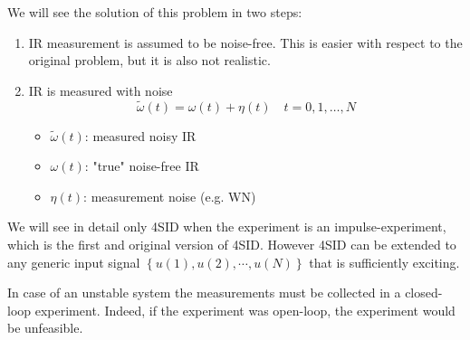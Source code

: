 We will see the solution of this problem in two steps:
\begin{enumerate}
    \item IR measurement is assumed to be noise-free.
    This is easier with respect to the original problem, but it is also not realistic.
    \item IR is measured with noise
    \[ \widetilde{\omega}(t) = \omega(t) + \eta(t) \quad t = 0, 1,\dots, N \]
    \begin{itemize}
        \item $\widetilde{\omega}(t)$: measured noisy IR
        \item $\omega(t)$: "true" noise-free IR
        \item $\eta(t)$: measurement noise (e.g. WN)
    \end{itemize}
\end{enumerate}
\begin{remark}
    We will see in detail only 4SID when the experiment is an impulse-experiment, which is the first and original version of 4SID.
    However 4SID can be extended to any generic input signal $\left\{ u(1), u(2), \cdots, u(N) \right\}$ that is sufficiently exciting.
\end{remark}
\begin{remark}
    In case of an unstable system the measurements must be collected in a closed-loop experiment.
    Indeed, if the experiment was open-loop, the experiment would be unfeasible.
\end{remark}